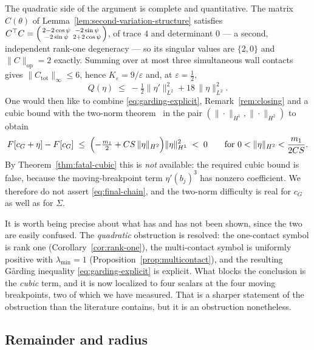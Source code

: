 \documentclass[11pt]{amsart}
\theoremstyle{plain}
\theoremstyle{definition}
\newcommand{\cG}{c_{G}}
\begin{document}
The quadratic side of the argument is complete and quantitative.  The
matrix $C(\theta)$ of Lemma~\ref{lem:second-variation-structure}
satisfies
$C^{\top}C = \begin{psmallmatrix}2-2\cos\psi & -2\sin\psi\\
-2\sin\psi & 2+2\cos\psi\end{psmallmatrix}$, of trace $4$ and
determinant $0$ --- a second, independent rank-one degeneracy --- so
its singular values are $\{2,0\}$ and $\|C\|_{\mathrm{op}} = 2$
exactly.  Summing over at most three simultaneous wall contacts gives
$\|C_{\mathrm{tot}}\|_{\infty}\leq6$, hence
$K_{\varepsilon} = 9/\varepsilon$ and, at $\varepsilon=\tfrac12$,
\begin{equation}\label{eq:garding-explicit}
   Q(\eta) \;\leq\; -\tfrac12\|\eta'\|^{2}_{L^{2}}
                    + 18\,\|\eta\|^{2}_{L^{2}} .
\end{equation}
One would then like to combine \eqref{eq:garding-explicit},
Remark~\ref{rem:closing} and a cubic bound with the two-norm
theorem~\cite{Ioffe1979,DambrineLamboley} in the pair
$(\|\cdot\|_{H^{1}},\|\cdot\|_{H^{2}})$ to obtain
\begin{equation}\label{eq:final-chain}
   F[\cG+\eta] - F[\cG]
   \;\leq\; \Bigl(-\tfrac{m_{1}}{2} + CS\,\|\eta\|_{H^{2}}\Bigr)
            \|\eta\|^{2}_{H^{1}}
   \;<\; 0
   \qquad\text{for } 0 < \|\eta\|_{H^{2}} < \frac{m_{1}}{2CS} .
\end{equation}
By Theorem~\ref{thm:fatal-cubic} this is \emph{not} available: the
required cubic bound is false, because the moving-breakpoint term
$\eta'(b_{j})^{3}$ has nonzero coefficient.  We therefore do not
assert \eqref{eq:final-chain}, and the two-norm difficulty is real for
$\cG$ as well as for $\Sigma$.

It is worth being precise about what has and has not been shown, since
the two are easily confused.  The \emph{quadratic} obstruction is
resolved: the one-contact symbol is rank one
(Corollary~\ref{cor:rank-one}), the multi-contact symbol is uniformly
positive with $\lambda_{\min}=1$
(Proposition~\ref{prop:multicontact}), and the resulting G\aa rding
inequality \eqref{eq:garding-explicit} is explicit.  What blocks the
conclusion is the \emph{cubic} term, and it is now localized to four
scalars at the four moving breakpoints, two of which we have measured.
That is a sharper statement of the obstruction than the literature
contains, but it is an obstruction nonetheless.

\subsection{Remainder and radius}\label{sec:remainder}
\end{document}
